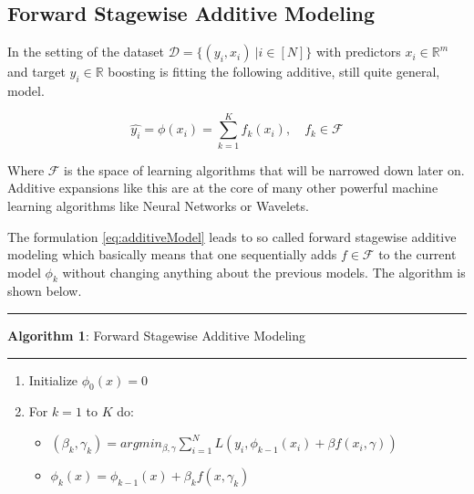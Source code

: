 \documentclass[
]{book}
\providecommand{\tightlist}{%
  \setlength{\itemsep}{0pt}\setlength{\parskip}{0pt}}
\begin{document}
\hypertarget{forward-stagewise-additive-modeling}{%
\subsection{Forward Stagewise Additive Modeling}\label{forward-stagewise-additive-modeling}}

In the setting of the dataset \(\mathcal{D} = \{(y_i,x_i)\ | i \in [N]\}\) with predictors \(x_i \in \mathbb{R}^m\) and target \(y_i \in \mathbb{R}\) boosting is fitting the following additive, still quite general, model.

\begin{equation}
  \hat{y_i} = \phi(x_i) = \sum_{k=1}^{K} f_k(x_i), \quad f_k \in \mathcal{F}
  \label{eq:additiveModel}
\end{equation}

Where \(\mathcal{F}\) is the space of learning algorithms that will be narrowed down later on. Additive expansions like this are at the core of many other powerful machine learning algorithms like Neural Networks or Wavelets.\citep{elements}

The formulation \eqref{eq:additiveModel} leads to so called forward stagewise additive modeling which basically means that one sequentially adds \(f \in \mathcal{F}\) to the current model \(\phi_k\) without changing anything about the previous models.\citep{elements} The algorithm is shown below.

\begin{center}\rule{0.5\linewidth}{0.5pt}\end{center}

\textbf{Algorithm 1}: Forward Stagewise Additive Modeling \citep{elements}

\begin{center}\rule{0.5\linewidth}{0.5pt}\end{center}

\begin{enumerate}
\def\labelenumi{\arabic{enumi}.}
\item
  Initialize \(\phi_0(x) = 0\)
\item
  For \(k = 1\) to \(K\) do:

  \begin{itemize}
  \tightlist
  \item
    \((\beta_k,\gamma_k) = argmin_{\beta,\gamma}\sum_{i=1}^N L(y_i,\phi_{k-1}(x_i) + \beta f(x_i,\gamma))\)
  \item
    \(\phi_k(x) = \phi_{k-1}(x) + \beta_k f(x, \gamma_k)\)
  \end{itemize}
\end{enumerate}
\end{document}
